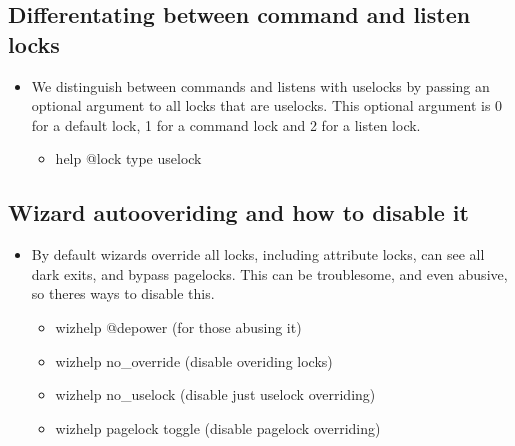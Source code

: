 \documentclass[letterpaper,10pt,english]{sphinxmanual}
\begin{document}
\subsection{Differentating between command and listen locks}
\label{\detokenize{features:differentating-between-command-and-listen-locks}}\begin{itemize}
\item {} 
\sphinxAtStartPar
We distinguish between commands and listens with uselocks by passing
an optional argument to all locks that are uselocks.  This optional
argument is 0 for a default lock, 1 for a command lock and 2 for
a listen lock.
\begin{itemize}
\item {} 
\sphinxAtStartPar
help @lock type uselock

\end{itemize}

\end{itemize}


\subsection{Wizard auto\sphinxhyphen{}overiding and how to disable it}
\label{\detokenize{features:wizard-auto-overiding-and-how-to-disable-it}}\begin{itemize}
\item {} 
\sphinxAtStartPar
By default wizards override all locks, including attribute locks,
can see all dark exits, and bypass pagelocks.  This can be
troublesome, and even abusive, so there\textquotesingle{}s ways to disable this.
\begin{itemize}
\item {} 
\sphinxAtStartPar
wizhelp @depower (for those abusing it)

\item {} 
\sphinxAtStartPar
wizhelp no\_override (disable overiding locks)

\item {} 
\sphinxAtStartPar
wizhelp no\_uselock (disable just uselock overriding)

\item {} 
\sphinxAtStartPar
wizhelp pagelock toggle (disable pagelock overriding)

\end{itemize}

\end{itemize}
\end{document}
